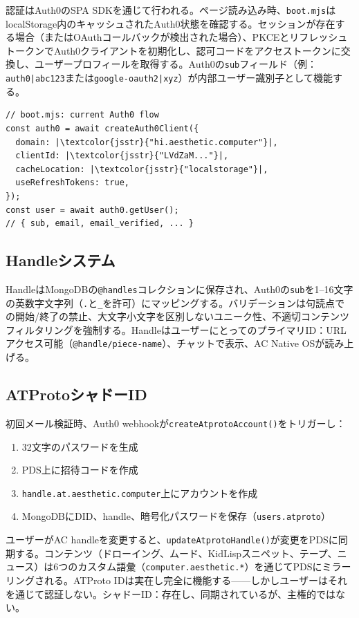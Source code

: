 \documentclass[10pt,letterpaper,twocolumn]{article}
\begin{document}
認証はAuth0のSPA SDKを通じて行われる。ページ読み込み時、\texttt{boot.mjs}はlocalStorage内のキャッシュされたAuth0状態を確認する。セッションが存在する場合（またはOAuthコールバックが検出された場合）、PKCEとリフレッシュトークンでAuth0クライアントを初期化し、認可コードをアクセストークンに交換し、ユーザープロフィールを取得する。Auth0の\texttt{sub}フィールド（例：\texttt{auth0|abc123}または\texttt{google-oauth2|xyz}）が内部ユーザー識別子として機能する。

\begin{lstlisting}[style=acjsstyle]
// boot.mjs: current Auth0 flow
const auth0 = await createAuth0Client({
  domain: |\textcolor{jsstr}{"hi.aesthetic.computer"}|,
  clientId: |\textcolor{jsstr}{"LVdZaM..."}|,
  cacheLocation: |\textcolor{jsstr}{"localstorage"}|,
  useRefreshTokens: true,
});
const user = await auth0.getUser();
// { sub, email, email_verified, ... }
\end{lstlisting}

\subsection{Handleシステム}

HandleはMongoDBの\texttt{@handles}コレクションに保存され、Auth0の\texttt{sub}を1--16文字の英数字文字列（\texttt{.}と\texttt{\_}を許可）にマッピングする。バリデーションは句読点での開始/終了の禁止、大文字小文字を区別しないユニーク性、不適切コンテンツフィルタリングを強制する。HandleはユーザーにとってのプライマリID：URLアクセス可能（\texttt{@handle/piece-name}）、チャットで表示、AC Native OSが読み上げる。

\subsection{ATProtoシャドーID}

初回メール検証時、Auth0 webhookが\texttt{createAtprotoAccount()}をトリガーし：

\begin{enumerate}
  \item 32文字のパスワードを生成
  \item PDS上に招待コードを作成
  \item \texttt{handle.at.aesthetic.computer}上にアカウントを作成
  \item MongoDBにDID、handle、暗号化パスワードを保存（\texttt{users.atproto}）
\end{enumerate}

ユーザーがAC handleを変更すると、\texttt{updateAtprotoHandle()}が変更をPDSに同期する。コンテンツ（ドローイング、ムード、KidLispスニペット、テープ、ニュース）は6つのカスタム語彙（\texttt{computer.aesthetic.*}）を通じてPDSにミラーリングされる。ATProto IDは実在し完全に機能する——しかしユーザーはそれを通じて認証しない。シャドーID：存在し、同期されているが、主権的ではない。
\end{document}
